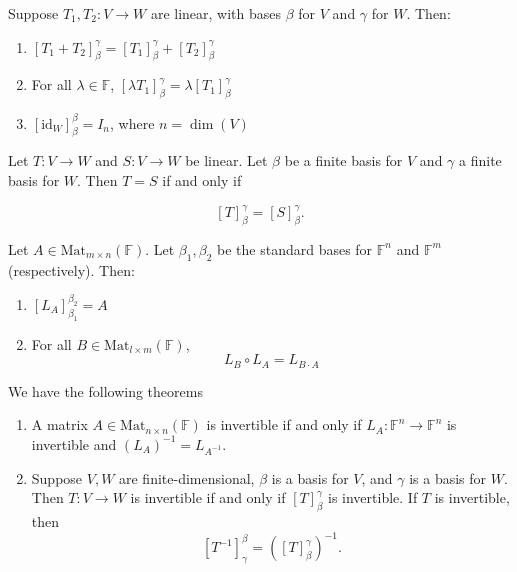 \documentclass{article}
\begin{document}
\begin{theorem}
Suppose \( T_1, T_2: V \to W \) are linear, with bases \( \beta \) for \( V \) and \( \gamma \) for \( W \). Then:
\begin{enumerate}
    \item \([T_1 + T_2]_{\beta}^{\gamma} = [T_1]_{\beta}^{\gamma} + [T_2]_{\beta}^{\gamma}\)
    \item For all \(\lambda \in \mathbb{F}\), \([ \lambda T_1 ]_{\beta}^{\gamma} = \lambda [T_1]_{\beta}^{\gamma}\)
    \item \([ \mathrm{id}_W ]_{\beta}^{\beta} = I_n\), where \( n = \dim(V) \)
\end{enumerate}
\end{theorem}


\begin{theorem}
Let \( T: V \to W \) and \( S: V \to W \) be linear. Let \( \beta \) be a finite basis for \( V \) and \( \gamma \) a finite basis for \( W \). Then \( T = S \) if and only if 

\[
[T]_{\beta}^{\gamma} = [S]_{\beta}^{\gamma}.
\]
\end{theorem}


\begin{theorem}
Let \( A \in \mathrm{Mat}_{m \times n}(\mathbb{F}) \). Let \( \beta_1, \beta_2 \) be the standard bases for \( \mathbb{F}^n \) and \( \mathbb{F}^m \) (respectively). Then:
\begin{enumerate}
    \item \([L_A]_{\beta_1}^{\beta_2} = A\)
    \item For all \( B \in \mathrm{Mat}_{l \times m}(\mathbb{F}) \),
    \[
    L_B \circ L_A = L_{B \cdot A}
    \]
\end{enumerate}
\end{theorem}

\begin{theorem} We have the following theorems

\begin{enumerate}[label = \alph{enumi}]
    \item A matrix \( A \in \mathrm{Mat}_{n \times n}(\mathbb{F}) \) is invertible if and only if \( L_A: \mathbb{F}^n \to \mathbb{F}^n \) is invertible and \((L_A)^{-1} = L_{A^{-1}}\).
    
    \item Suppose \( V, W \) are finite-dimensional, \(\beta\) is a basis for \( V \), and \(\gamma\) is a basis for \( W \). Then \( T: V \to W \) is invertible if and only if \([T]_{\beta}^{\gamma}\) is invertible. If \( T \) is invertible, then 
    \[
    [T^{-1}]_{\gamma}^{\beta} = ([T]_{\beta}^{\gamma})^{-1}.
    \]
\end{enumerate}
\end{theorem}
\end{document}
